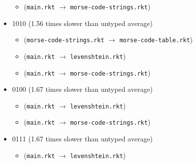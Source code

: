 \documentclass{article}
\newcommand{\mono}[1]{\texttt{#1}}
\begin{document}
\begin{itemize}
\begin{itemize}
  \item (\mono{main.rkt} $\rightarrow$ \mono{morse-code-strings.rkt})
  \end{itemize}
\item 1010 (1.56 times slower than untyped average)
  \begin{itemize}
  \item (\mono{morse-code-strings.rkt} $\rightarrow$ \mono{morse-code-table.rkt})
  \item (\mono{main.rkt} $\rightarrow$ \mono{levenshtein.rkt})
  \item (\mono{main.rkt} $\rightarrow$ \mono{morse-code-strings.rkt})
  \end{itemize}
\item 0100 (1.67 times slower than untyped average)
  \begin{itemize}
  \item (\mono{main.rkt} $\rightarrow$ \mono{levenshtein.rkt})
  \item (\mono{main.rkt} $\rightarrow$ \mono{morse-code-strings.rkt})
  \end{itemize}
\item 0111 (1.67 times slower than untyped average)
  \begin{itemize}
  \item (\mono{main.rkt} $\rightarrow$ \mono{levenshtein.rkt})
  \end{itemize}


\end{itemize}
\end{document}
